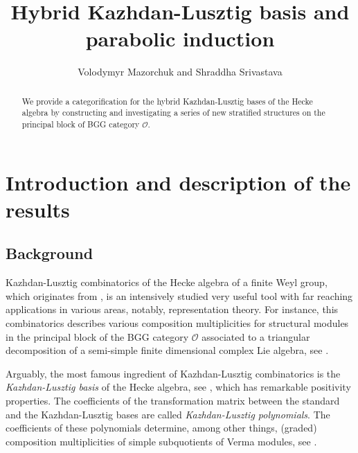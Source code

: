 \documentclass[a4paper]{amsart}
\begin{document}
\title[Hybrid KL basis and parabolic induction]
{Hybrid Kazhdan-Lusztig basis and parabolic induction}
\author[V.~Mazorchuk and S.~Srivastava]{Volodymyr 
Mazorchuk and Shraddha Srivastava}

\begin{abstract}
We provide a categorification for the hybrid 
Kazhdan-Lusztig bases of the Hecke algebra by
constructing and investigating  a series of 
new stratified structures  on the principal 
block of BGG category $\mathcal{O}$.
\end{abstract}

\maketitle


\section{Introduction and description of the results}\label{s0}

\subsection{Background}\label{s0.1}

Kazhdan-Lusztig combinatorics of the Hecke algebra of 
a finite Weyl group, which originates from \cite{KL}, 
is an intensively studied very useful tool with far
reaching applications in various areas, notably, 
representation theory. For instance, this combinatorics
describes various composition multiplicities for structural
modules in the principal block of the BGG category 
$\mathcal{O}$ associated to a triangular decomposition
of a semi-simple finite dimensional complex Lie algebra, 
see \cite{BGG,Hu}.

Arguably, the most famous ingredient of Kazhdan-Lusztig 
combinatorics is the {\em Kazhdan-Lusztig basis} of the 
Hecke algebra, see \cite{KL}, which has remarkable 
positivity properties. The coefficients of the transformation
matrix between the standard and the Kazhdan-Lusztig bases
are called {\em Kazhdan-Lusztig polynomials}. The coefficients
of these polynomials determine, among other things, 
(graded) composition multiplicities of simple subquotients 
of Verma modules, see \cite{KL,Hu,BB81,BK81}. 
\end{document}
